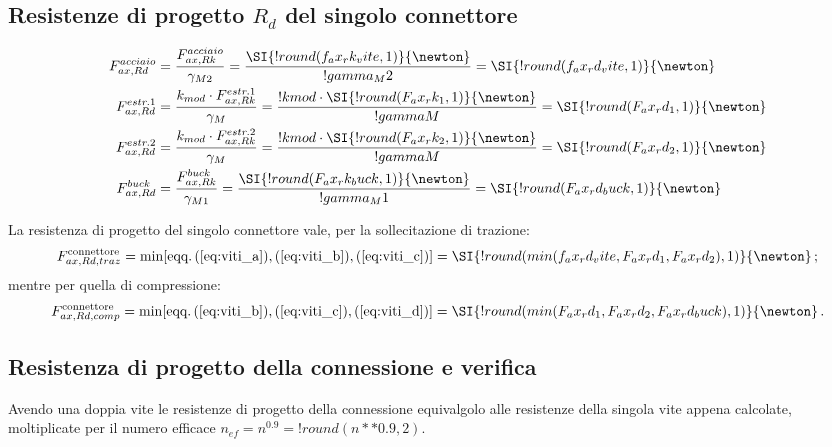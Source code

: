 \begin{pysub}[viti]
\subsection{Resistenze di progetto $R_d$ del singolo connettore}
\begin{align}
    F_{ax,Rd}^{acciaio} 
    &= \dfrac{F_{ax,Rk}^{acciaio}}{\gamma_{M2}} 
    = \dfrac{\SI{!{round(f_ax_rk_vite,1)}}{\newton}}{!{gamma_M2}} 
    = \SI{!{round(f_ax_rd_vite,1)}}{\newton} \label{eq:viti_a} \\
    F_{ax,Rd}^{estr. 1} 
    &= \dfrac{k_{mod} \cdot F_{ax,Rk}^{estr. 1}}{\gamma_{M}} 
    = \dfrac{!{kmod} \cdot \SI{!{round(F_ax_rk_1,1)}}{\newton}}{!{gammaM}} 
    = \SI{!{round(F_ax_rd_1,1)}}{\newton} \label{eq:viti_b} \\
    F_{ax,Rd}^{estr. 2} 
    &= \dfrac{k_{mod} \cdot F_{ax,Rk}^{estr. 2}}{\gamma_{M}} 
    = \dfrac{!{kmod} \cdot \SI{!{round(F_ax_rk_2,1)}}{\newton}}{!{gammaM}} 
    = \SI{!{round(F_ax_rd_2,1)}}{\newton} \label{eq:viti_c} \\
    F_{ax,Rd}^{buck} 
    &= \dfrac{F_{ax,Rk}^{buck}}{\gamma_{M1}} 
    = \dfrac{\SI{!{round(F_ax_rk_buck,1)}}{\newton}}{!{gamma_M1}} 
    = \SI{!{round(F_ax_rd_buck,1)}}{\newton} \label{eq:viti_d}
\end{align}


La resistenza di progetto del singolo connettore vale,
per la sollecitazione di trazione:
\begin{equation}
    F_{ax,Rd,traz}^\textup{connettore} = \min[\text{eqq.} \, (\ref{eq:viti_a}), (\ref{eq:viti_b}), (\ref{eq:viti_c})] = \SI{!{round(min(f_ax_rd_vite,F_ax_rd_1,F_ax_rd_2),1)}}{\newton} \, ;
\end{equation}
mentre per quella di compressione:
\begin{equation}
    F_{ax,Rd,comp}^\textup{connettore} = \min[\text{eqq.} \, (\ref{eq:viti_b}), (\ref{eq:viti_c}), (\ref{eq:viti_d})] = \SI{!{round(min(F_ax_rd_1,F_ax_rd_2,F_ax_rd_buck),1)}}{\newton} \, .
\end{equation}

\subsection{Resistenza di progetto della connessione e verifica}
Avendo una doppia vite le resistenze di progetto della connessione equivalgolo alle resistenze della singola vite appena calcolate, moltiplicate per il numero efficace $n_{ef} = n^{0.9} = !{round(n**0.9,2)}$.


\end{pysub}
